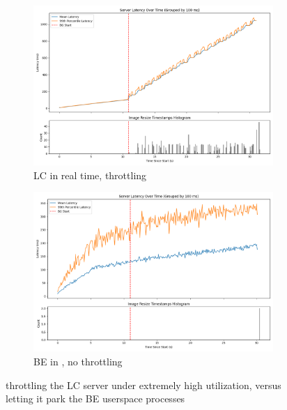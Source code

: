 \begin{figure}[t]
    \centering
    \begin{subfigure}[t]{\columnwidth}
        \includegraphics[width=\columnwidth]{graphs/overload-rt.png}
        \caption{LC in real time, throttling}\label{fig:overload-rt}
        \vspace{12pt}
    \end{subfigure}
    \hspace{\fill}
    \begin{subfigure}[t]{\columnwidth}
        \includegraphics[width=\columnwidth]{graphs/overload-schedbe.png}
        \caption{BE in \schedbe{}, no throttling}\label{fig:overload-schedbe}
    \end{subfigure}
    \vspace{4pt}
    \caption{throttling the LC server under extremely high utilization, versus
    letting it park the BE userspace processes}
\end{figure}

